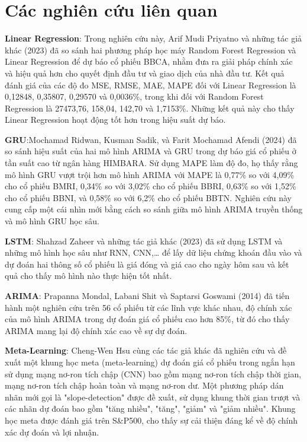 \section{Các nghiên cứu liên quan}
\textbf{Linear Regression}: Trong nghiên cứu này, Arif Mudi Priyatno và những tác giả khác \cite{b1} (2023) đã so sánh hai phương pháp học máy Random Forest Regression và Linear Regression để dự báo cổ phiếu BBCA, nhằm đưa ra giải pháp chính xác và hiệu quả hơn cho quyết định đầu tư và giao dịch của nhà đầu tư. Kết quả đánh giá của các độ đo MSE, RMSE, MAE, MAPE đối với Linear Regression là 0,12848, 0,35807, 0,29570 và 0,0036\%, trong khi đối với Random Forest Regression là 27473,76, 158,04, 142,70 và 1,7153\%. Những kết quả này cho thấy Linear Regression hoạt động tốt hơn trong hiệu suất dự báo.
\par
\textbf{GRU}:Mochamad Ridwan, Kusman Sadik, và Farit Mochamad Afendi \cite{b2} (2024) đã so sánh hiệu suất của hai mô hình ARIMA và GRU trong dự báo giá cổ phiếu ở tần suất cao từ ngân hàng HIMBARA. Sử dụng MAPE làm độ đo, họ thấy rằng mô hình GRU vượt trội hơn mô hình ARIMA với MAPE là 0,77\% so với 4,09\% cho cổ phiếu BMRI, 0,34\% so với 3,02\% cho cổ phiếu BBRI, 0,63\% so với 1,52\% cho cổ phiếu BBNI, và 0,58\% so với 6,2\% cho cổ phiếu BBTN. Nghiên cứu này cung cấp một cái nhìn mới bằng cách so sánh giữa mô hình ARIMA truyền thống và mô hình GRU học sâu.
\par
\textbf{LSTM}: Shahzad Zaheer và những tác giả khác \cite{b3} (2023) đã sử dụng LSTM và những mô hình học sâu như RNN, CNN,… để lấy dữ liệu chứng khoán đầu vào và dự đoán hai thông số cổ phiếu là giá đóng và giá cao cho ngày hôm sau và kết quả cho thấy mô hình nào thực hiện tốt nhất.
\par
\textbf{ARIMA}: Prapanna Mondal, Labani Shit và Saptarsi Goswami \cite{b4} (2014) đã tiến hành một nghiên cứu trên 56 cổ phiếu từ các lĩnh vực khác nhau, độ chính xác của mô hình ARIMA trong dự đoán giá cổ phiếu cao hơn 85\%, từ đó cho thấy ARIMA mang lại độ chính xác cao về sự dự đoán.
\par
\textbf{Meta-Learning}: Cheng-Wen Hsu cùng các tác giả khác \cite{b5} đã nghiên cứu và đề xuất một khung học meta (meta-learning) dự đoán giá cổ phiếu trong ngắn hạn sử dụng mạng nơ-ron tích chập (CNN) bao gồm mạng nơ-ron tích chập thời gian, mạng nơ-ron tích chập hoàn toàn và mạng nơ-ron dư. Một phương pháp dán nhãn mới gọi là "slope-detection" được đề xuất, sử dụng khung thời gian trượt và các nhãn dự đoán bao gồm "tăng nhiều", "tăng", "giảm" và "giảm nhiều". Khung học meta được đánh giá trên S\&P500, cho thấy sự cải thiện đáng kể về độ chính xác dự đoán và lợi nhuận.
